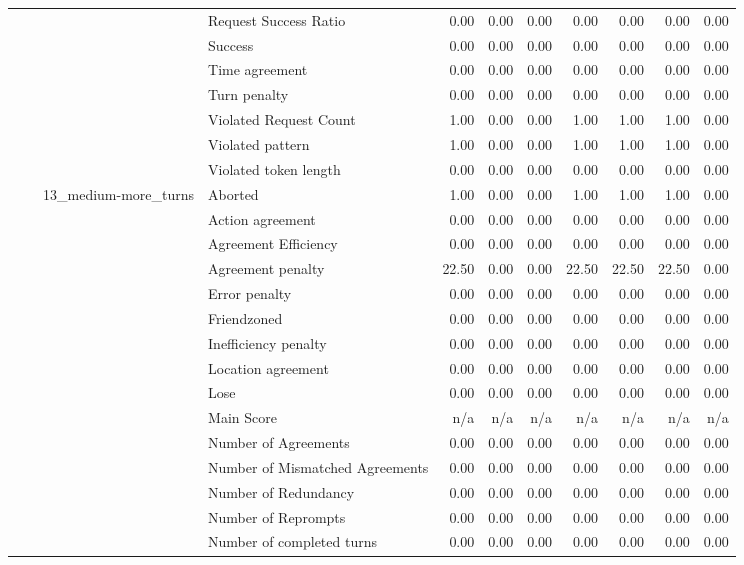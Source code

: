 \begin{tabular}{llllrrrrrrr}
 &  &  & Request Success Ratio & 0.00 & 0.00 & 0.00 & 0.00 & 0.00 & 0.00 & 0.00 \\
 &  &  & Success & 0.00 & 0.00 & 0.00 & 0.00 & 0.00 & 0.00 & 0.00 \\
 &  &  & Time agreement & 0.00 & 0.00 & 0.00 & 0.00 & 0.00 & 0.00 & 0.00 \\
 &  &  & Turn penalty & 0.00 & 0.00 & 0.00 & 0.00 & 0.00 & 0.00 & 0.00 \\
 &  &  & Violated Request Count & 1.00 & 0.00 & 0.00 & 1.00 & 1.00 & 1.00 & 0.00 \\
 &  &  & Violated pattern & 1.00 & 0.00 & 0.00 & 1.00 & 1.00 & 1.00 & 0.00 \\
 &  &  & Violated token length & 0.00 & 0.00 & 0.00 & 0.00 & 0.00 & 0.00 & 0.00 \\
\cline{3-11}
 &  & \multirow[t]{27}{*}{13_medium-more_turns} & Aborted & 1.00 & 0.00 & 0.00 & 1.00 & 1.00 & 1.00 & 0.00 \\
 &  &  & Action agreement & 0.00 & 0.00 & 0.00 & 0.00 & 0.00 & 0.00 & 0.00 \\
 &  &  & Agreement Efficiency & 0.00 & 0.00 & 0.00 & 0.00 & 0.00 & 0.00 & 0.00 \\
 &  &  & Agreement penalty & 22.50 & 0.00 & 0.00 & 22.50 & 22.50 & 22.50 & 0.00 \\
 &  &  & Error penalty & 0.00 & 0.00 & 0.00 & 0.00 & 0.00 & 0.00 & 0.00 \\
 &  &  & Friendzoned & 0.00 & 0.00 & 0.00 & 0.00 & 0.00 & 0.00 & 0.00 \\
 &  &  & Inefficiency penalty & 0.00 & 0.00 & 0.00 & 0.00 & 0.00 & 0.00 & 0.00 \\
 &  &  & Location agreement & 0.00 & 0.00 & 0.00 & 0.00 & 0.00 & 0.00 & 0.00 \\
 &  &  & Lose & 0.00 & 0.00 & 0.00 & 0.00 & 0.00 & 0.00 & 0.00 \\
 &  &  & Main Score & n/a & n/a & n/a & n/a & n/a & n/a & n/a \\
 &  &  & Number of Agreements & 0.00 & 0.00 & 0.00 & 0.00 & 0.00 & 0.00 & 0.00 \\
 &  &  & Number of Mismatched Agreements & 0.00 & 0.00 & 0.00 & 0.00 & 0.00 & 0.00 & 0.00 \\
 &  &  & Number of Redundancy & 0.00 & 0.00 & 0.00 & 0.00 & 0.00 & 0.00 & 0.00 \\
 &  &  & Number of Reprompts & 0.00 & 0.00 & 0.00 & 0.00 & 0.00 & 0.00 & 0.00 \\
 &  &  & Number of completed turns & 0.00 & 0.00 & 0.00 & 0.00 & 0.00 & 0.00 & 0.00 \\

\end{tabular}
